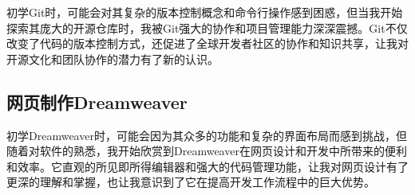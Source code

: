 \documentclass[supercite]{Experimental_Report}
\theoremstyle{definition}
\begin{document}
初学Git时，可能会对其复杂的版本控制概念和命令行操作感到困惑，但当我开始探索其庞大的开源仓库时，我被Git强大的协作和项目管理能力深深震撼。Git不仅改变了代码的版本控制方式，还促进了全球开发者社区的协作和知识共享，让我对开源文化和团队协作的潜力有了新的认识。

\subsection{网页制作Dreamweaver}

初学Dreamweaver时，可能会因为其众多的功能和复杂的界面布局而感到挑战，但随着对软件的熟悉，我开始欣赏到Dreamweaver在网页设计和开发中所带来的便利和效率。它直观的所见即所得编辑器和强大的代码管理功能，让我对网页设计有了更深的理解和掌握，也让我意识到了它在提高开发工作流程中的巨大优势。
\end{document}
